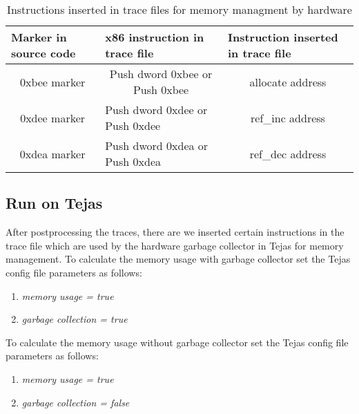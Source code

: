 \documentclass[a4paper]{article}
\begin{document}
\begin{table}[h]
\centering	
\begin{tabular}{|c|l|c|}
\hline
\multicolumn{1}{|l|}{\textbf{Marker in source code}} & \textbf{x86 instruction in trace file}              & \multicolumn{1}{l|}{\textbf{Instruction inserted in trace file}} \\ \hline
0xbee marker                                         & \multicolumn{1}{c|}{Push dword 0xbee or Push 0xbee} & allocate address                                                 \\ \hline
0xdee marker                                         & Push dword 0xdee or Push 0xdee                      & ref\_inc address                                                 \\ \hline
0xdea marker                                         & Push dword 0xdea or Push 0xdea                      & ref\_dec address                                                 \\ \hline
\end{tabular}
\caption{Instructions inserted in trace files for memory managment by hardware}
\end{table}

\subsection{Run on Tejas}
After postprocessing the traces, there are we inserted certain instructions in the trace file which are used by the hardware garbage collector in Tejas for memory management.
To calculate the memory usage with garbage collector set the Tejas config file parameters as follows:
\begin{enumerate}
\item \textit{memory usage = true}
\item \textit{garbage collection = true}
\end{enumerate}
To calculate the memory usage without garbage collector set the Tejas config file parameters as follows:
\begin{enumerate}
\item \textit{memory usage = true}
\item \textit{garbage collection = false}
\end{enumerate}
\end{document}
